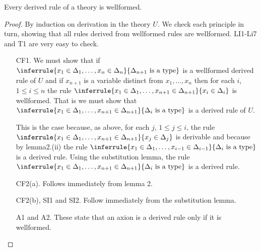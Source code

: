 \begin{lemma} 
Every derived rule of a theory is wellformed.
\end{lemma}
\begin{proof}
  By induction on derivation in the theory $U$.
  We check each principle in turn, showing that all rules derived from wellformed rules are wellformed.
  LI1-Li7 and T1 are very easy to check.

  \begin{enumerate}
  \item[CF1.] We must show that if $\inferrule{x_1\in\Delta_1,\ldots,x_n\in\Delta_n}{\Delta_{n+1}\isatype}$ is a wellformed derived rule of $U$ and if $x_{n+1}$ is a variable distinct from $x_1,\ldots,x_n$ then for each $i$, $1\leq i\leq n$ the rule $\inferrule{x_1\in\Delta_1,\ldots,x_{n+1}\in\Delta_{n+1}}{x_i\in\Delta_i}$ is wellformed.
  That is we must show that $\inferrule{x_1\in\Delta_1,\ldots,x_{n+1}\in\Delta_{n+1}}{\Delta_i\isatype}$ is a derived rule of $U$.

  This is the case because, as above, for each $j$, $1\leq j\leq i$, the rule $\inferrule{x_1\in\Delta_1,\ldots,x_{n+1}\in\Delta_{n+1}}{x_j\in\Delta_j}$ is derivable and because by lemma2.(ii) the rule $\inferrule{x_1\in\Delta_1,\ldots,x_{i-1}\in\Delta_{i-1}}{\Delta_i\isatype}$ is a derived rule. Using the substitution lemma, the rule $\inferrule{x_1\in\Delta_1,\ldots,x_{n+1}\in\Delta_{n+1}}{\Delta_i\isatype}$ is a derived rule.

  \item[CF2(a).] Follows immediately from lemma 2.

  \item[CF2(b), SI1 and SI2.] Follow immediately from the substitution lemma.

  \item[A1 and A2.] These state that an axion is a derived rule only if it is wellformed.
  \end{enumerate}
\end{proof}

